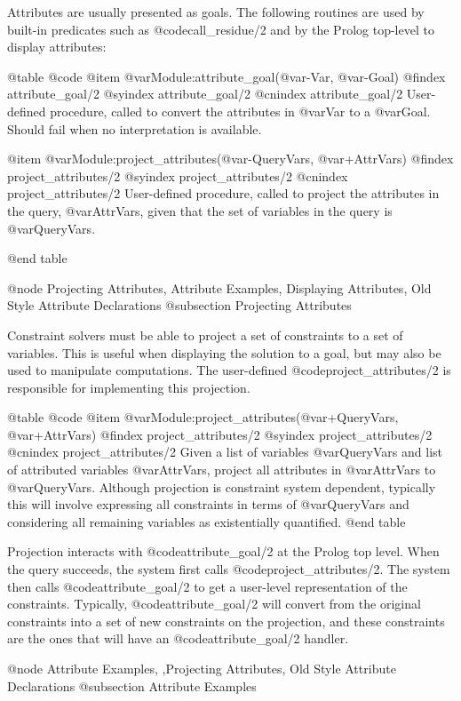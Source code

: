 {{{{{{{{{Attributes are usually presented as goals. The following routines are
used by built-in predicates such as @code{call_residue/2} and by the
Prolog top-level to display attributes:

@table @code
@item @var{Module}:attribute_goal(@var{-Var}, @var{-Goal})
@findex attribute_goal/2
@syindex attribute_goal/2
@cnindex attribute_goal/2
User-defined procedure, called to convert the attributes in @var{Var} to
a @var{Goal}. Should fail when no interpretation is available.

@item @var{Module}:project_attributes(@var{-QueryVars}, @var{+AttrVars})
@findex project_attributes/2
@syindex project_attributes/2
@cnindex project_attributes/2
User-defined procedure, called to project the attributes in the query,
@var{AttrVars}, given that the set of variables in the query is
@var{QueryVars}.

@end table

@node Projecting Attributes, Attribute Examples, Displaying Attributes, Old Style Attribute Declarations
@subsection Projecting Attributes

Constraint solvers must be able to project a set of constraints to a set
of variables. This is useful when displaying the solution to a goal, but
may also be used to manipulate computations. The user-defined
@code{project_attributes/2} is responsible for implementing this
projection.


@table @code
@item @var{Module}:project_attributes(@var{+QueryVars}, @var{+AttrVars})
@findex project_attributes/2
@syindex project_attributes/2
@cnindex project_attributes/2
Given a list of variables @var{QueryVars} and list of attributed
variables @var{AttrVars}, project all attributes in @var{AttrVars} to
@var{QueryVars}. Although projection is constraint system dependent,
typically this will involve expressing all constraints in terms of
@var{QueryVars} and considering all remaining variables as existentially
quantified.
@end table

Projection interacts with @code{attribute_goal/2} at the Prolog top
level. When the query succeeds, the system first calls
@code{project_attributes/2}. The system then calls
@code{attribute_goal/2} to get a user-level representation of the
constraints. Typically, @code{attribute_goal/2} will convert from the
original constraints into a set of new constraints on the projection,
and these constraints are the ones that will have an
@code{attribute_goal/2} handler.

@node Attribute Examples, ,Projecting Attributes, Old Style Attribute Declarations
@subsection Attribute Examples

}}}}}}}}}
